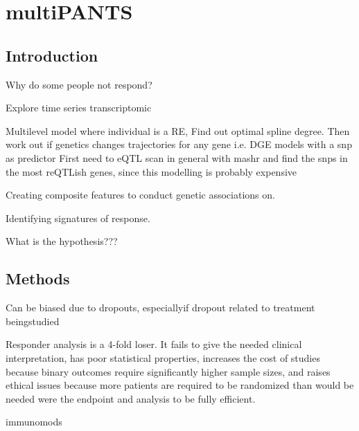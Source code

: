 %
%

\chapter{multiPANTS}

\section{Introduction}

Why do some people not respond?

Explore time series transcriptomic

Multilevel model where individual is a RE, 
Find out optimal spline degree.
Then work out if genetics changes trajectories for any gene i.e. DGE models with a snp as predictor
First need to eQTL scan in general with mashr and find the snps in the most reQTLish genes, since this modelling is probably expensive

Creating composite features to conduct genetic associations on.

Identifying signatures of response.

What is the hypothesis???


\section{Methods}

Can be biased due to dropouts, especiallyif dropout related to treatment beingstudied



Responder analysis is a 4-fold loser. It fails to give the needed clinical
interpretation, has poor statistical properties, increases the cost of studies
because binary outcomes require significantly higher sample sizes, and raises
ethical issues because more patients are required to be randomized than would
be needed were the endpoint and analysis to be fully efficient.

immunomods

